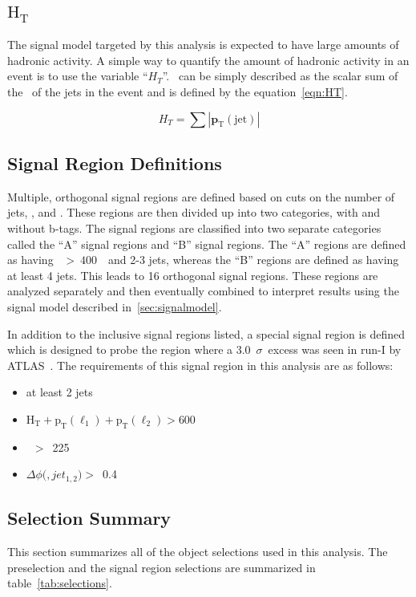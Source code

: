 \subsection{\texorpdfstring{$\mathrm{H_{T}}$}{HT}}
\label{ssec:HT}

The signal model targeted by this analysis is expected to have large amounts of hadronic activity.
A simple way to quantify the amount of hadronic activity in an event is to use the variable ``$H_{T}$''.
\HT\ can be simply described as the scalar sum of the \pt\ of the jets in the event and is defined by the equation~\ref{eqn:HT}.

\begin{equation}
  \label{eqn:HT}
  H_{T} = \sum{\mathrm{|\mathbf{p}_{T}(jet)|}}
\end{equation}

\subsection{Signal Region Definitions}
\label{sec:SRs}
Multiple, orthogonal signal regions are defined based on cuts on the number of jets, \Ht, and \MET.
These regions are then divided up into two categories, with and without b-tags.
The signal regions are classified into two separate categories called the ``A'' signal regions and ``B'' signal regions.
The ``A'' regions are defined as having \Ht\ $>~400$~\gev\ and 2-3 jets,
whereas the ``B'' regions are defined as having at least 4 jets. 
This leads to 16 orthogonal signal regions.
These regions are analyzed separately and then eventually combined to interpret results using the signal model described in~\ref{sec:signalmodel}.

In addition to the inclusive signal regions listed,
a special signal region is defined which is designed to probe the region where a 3.0~$\sigma$~excess was seen in run-I by ATLAS~\cite{ATLASZPAPER}.
The requirements of this signal region in this analysis are as follows:

\begin{itemize}
\item at least 2 jets
\item $\mathrm{H_{T}+p_{T}(\ell_1)+p_{T}(\ell_2) > }$600 \gev
\item \MET~$>$~225 \gev
\item $\Delta\phi($\MET$,jet_{1,2})>$~0.4
\end{itemize}

\subsection{Selection Summary}
\label{sec:selsummary}
This section summarizes all of the object selections used in this analysis.
The preselection and the signal region selections are summarized in table~\ref{tab:selections}.

